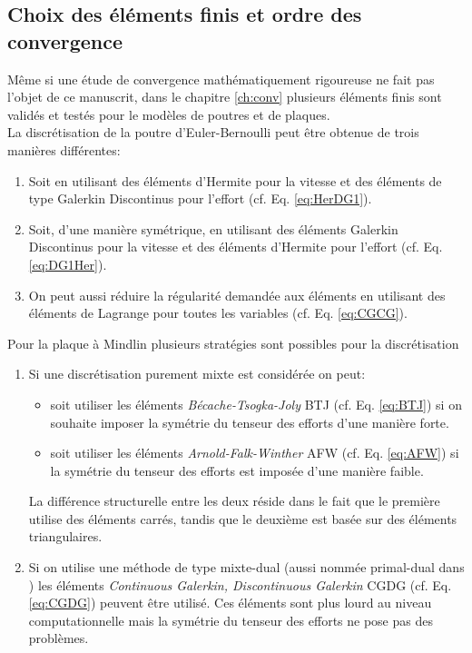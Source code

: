 \subsection*{Choix des éléments finis et ordre des convergence}
 
Même si une étude de convergence mathématiquement rigoureuse ne fait pas l'objet de ce manuscrit, dans le chapitre \ref{ch:conv} plusieurs éléments finis sont validés et testés pour le modèles de poutres et de plaques. \\

La discrétisation de la poutre d'Euler-Bernoulli peut être obtenue de trois manières différentes:
\begin{enumerate}
\item Soit en utilisant des éléments d'Hermite pour la vitesse et des éléments de type Galerkin Discontinus pour l'effort (cf. Eq. \eqref{eq:HerDG1}). 
\item Soit, d'une manière symétrique, en utilisant des éléments Galerkin Discontinus pour la vitesse et des éléments d'Hermite pour l'effort (cf. Eq. \eqref{eq:DG1Her}). 
\item On peut aussi réduire la régularité demandée aux éléments en utilisant des éléments de Lagrange pour toutes les variables (cf. Eq. \eqref{eq:CGCG}).
\end{enumerate}
 
Pour la plaque à Mindlin plusieurs stratégies sont possibles pour la discrétisation
\begin{enumerate}
	\item Si une discrétisation purement mixte est considérée on peut:
	\begin{itemize}
		\item soit utiliser les éléments \textit{Bécache-Tsogka-Joly} BTJ (cf. Eq. \eqref{eq:BTJ}) si on souhaite imposer la symétrie du tenseur des efforts d'une manière forte.
		\item soit utiliser les éléments \textit{Arnold-Falk-Winther} AFW (cf. Eq. \eqref{eq:AFW}) si la symétrie du tenseur des efforts est imposée d'une manière faible.
	\end{itemize}  
	La différence structurelle entre les deux réside dans le fait que le première utilise des éléments carrés, tandis que le deuxième est basée sur des éléments triangulaires.
	\item Si on utilise une méthode de type mixte-dual (aussi nommée primal-dual dans \cite{joly2003variational}) les éléments \textit{Continuous Galerkin, Discontinuous Galerkin} CGDG (cf. Eq. \eqref{eq:CGDG}) peuvent être utilisé. Ces éléments sont plus lourd au niveau computationnelle mais la symétrie du tenseur des efforts ne pose pas des problèmes.
\end{enumerate}

